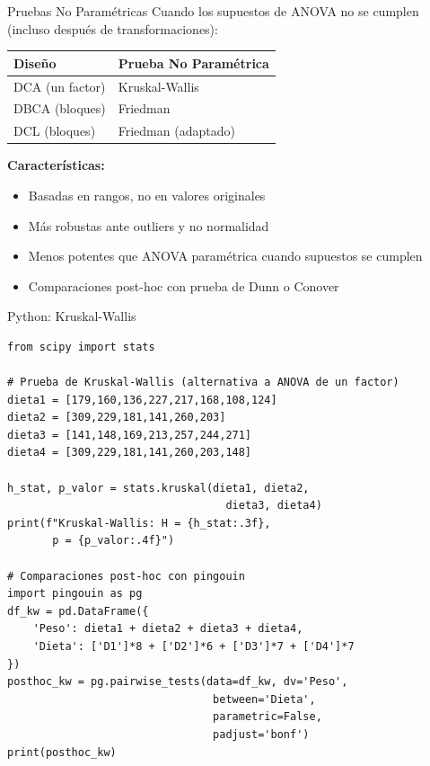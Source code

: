 \documentclass[aspectratio=169]{beamer}
\begin{document}
\begin{frame}{Pruebas No Paramétricas}
Cuando los supuestos de ANOVA no se cumplen (incluso después de transformaciones):

\vspace{0.3cm}

\begin{table}
\begin{tabular}{ll}
\toprule
\textbf{Diseño} & \textbf{Prueba No Paramétrica} \\
\midrule
DCA (un factor) & Kruskal-Wallis \\
DBCA (bloques) & Friedman \\
DCL (bloques) & Friedman (adaptado) \\
\bottomrule
\end{tabular}
\end{table}

\vspace{0.3cm}

\textbf{Características:}
\begin{itemize}
\item Basadas en rangos, no en valores originales
\item Más robustas ante outliers y no normalidad
\item Menos potentes que ANOVA paramétrica cuando supuestos se cumplen
\item Comparaciones post-hoc con prueba de Dunn o Conover
\end{itemize}
\end{frame}

\begin{frame}[fragile]{Python: Kruskal-Wallis}
\small
\begin{verbatim}
from scipy import stats

# Prueba de Kruskal-Wallis (alternativa a ANOVA de un factor)
dieta1 = [179,160,136,227,217,168,108,124]
dieta2 = [309,229,181,141,260,203]
dieta3 = [141,148,169,213,257,244,271]
dieta4 = [309,229,181,141,260,203,148]

h_stat, p_valor = stats.kruskal(dieta1, dieta2,
                                  dieta3, dieta4)
print(f"Kruskal-Wallis: H = {h_stat:.3f}, 
       p = {p_valor:.4f}")

# Comparaciones post-hoc con pingouin
import pingouin as pg
df_kw = pd.DataFrame({
    'Peso': dieta1 + dieta2 + dieta3 + dieta4,
    'Dieta': ['D1']*8 + ['D2']*6 + ['D3']*7 + ['D4']*7
})
posthoc_kw = pg.pairwise_tests(data=df_kw, dv='Peso',
                                between='Dieta',
                                parametric=False,
                                padjust='bonf')
print(posthoc_kw)
\end{verbatim}
\end{frame}
\end{document}
